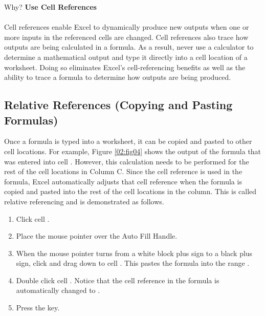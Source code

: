 \begin{center}
	\begin{infobox}{Why?}
		\textbf{Use Cell References}
		\\
		\\
		Cell references enable Excel to dynamically produce new outputs when one or more inputs in the referenced cells are changed. Cell references also trace how outputs are being calculated in a formula. As a result, never use a calculator to determine a mathematical output and type it directly into a cell location of a worksheet. Doing so eliminates Excel's cell-referencing benefits as well as the ability to trace a formula to determine how outputs are being produced.
	\end{infobox}
\end{center}

\subsection{Relative References (Copying and Pasting Formulas)}

Once a formula is typed into a worksheet, it can be copied and pasted to other cell locations. For example, Figure \ref{02:fig04} shows the output of the formula that was entered into cell . However, this calculation needs to be performed for the rest of the cell locations in Column C. Since the  cell reference is used in the formula, Excel automatically adjusts that cell reference when the formula is copied and pasted into the rest of the cell locations in the column. This is called relative referencing and is demonstrated as follows.

\begin{enumerate}
	\item Click cell .
	\item Place the mouse pointer over the Auto Fill Handle.
	\item When the mouse pointer turns from a white block plus sign to a black plus sign, click and drag down to cell . This pastes the formula into the range .
	\item Double click cell . Notice that the cell reference in the formula is automatically changed to .
	\item Press the  key.
\end{enumerate}

